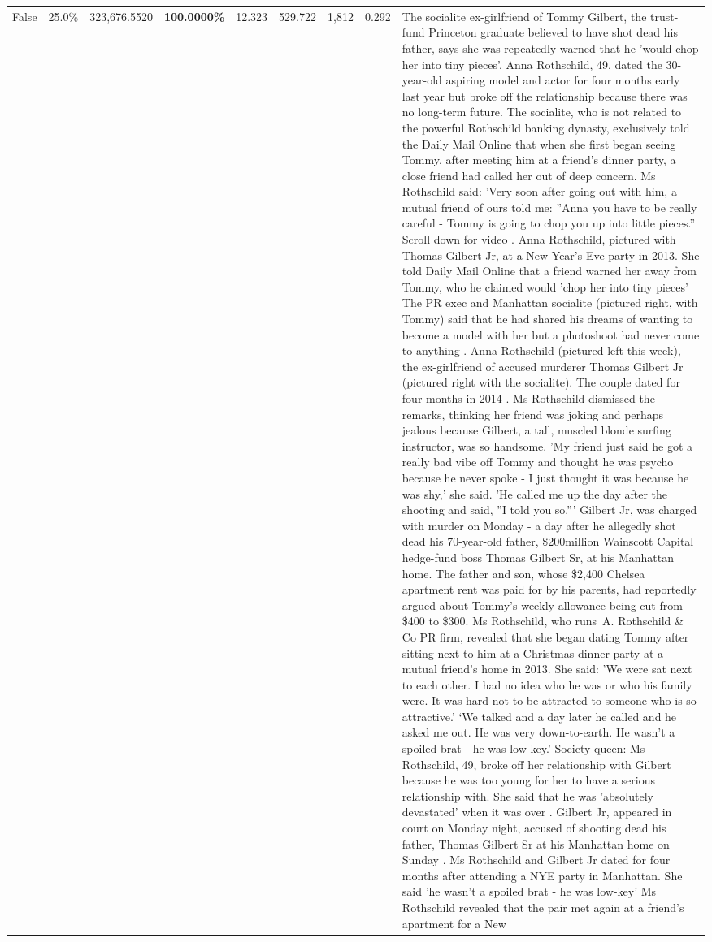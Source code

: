 \begin{table}[H]
\begin{tabular}{lllrlllll}
False & 25.0\% & 323,676.5520 & \bfseries \color{red} 100.0000\% & 12.323 & 529.722 & 1,812 & 0.292 & The socialite ex-girlfriend of Tommy Gilbert, the trust-fund Princeton graduate believed to have shot dead his father, says she was repeatedly warned that he 'would chop her into tiny pieces'. Anna Rothschild, 49, dated the 30-year-old aspiring model and actor for four months early last year but broke off the relationship because there was no long-term future. The socialite, who is not related to the powerful Rothschild banking dynasty, exclusively told the Daily Mail Online that when she first began seeing Tommy, after meeting him at a friend's dinner party, a close friend had called her out of deep concern. Ms Rothschild said: 'Very soon after going out with him, a mutual friend of ours told me: ''Anna you have to be really careful - Tommy is going to chop you up into little pieces.'' Scroll down for video . Anna Rothschild, pictured with Thomas Gilbert Jr, at a New Year's Eve party in 2013. She told Daily Mail Online that a friend warned her away from Tommy, who he claimed would 'chop her into tiny pieces' The PR exec and Manhattan socialite (pictured right, with Tommy) said that he had shared his dreams of wanting to become a model with her but a photoshoot had never come to anything . Anna Rothschild (pictured left this week), the ex-girlfriend of accused murderer Thomas Gilbert Jr (pictured right with the socialite). The couple dated for four months in 2014 . Ms Rothschild dismissed the remarks, thinking her friend was joking and perhaps jealous because Gilbert, a tall, muscled blonde surfing instructor, was so handsome. 'My friend just said he got a really bad vibe off Tommy and thought he was psycho because he never spoke - I just thought it was because he was shy,' she said. 'He called me up the day after the shooting and said, ''I told you so.''' Gilbert Jr, was charged with murder on Monday - a day after he allegedly shot dead his 70-year-old father, \$200million Wainscott Capital hedge-fund boss Thomas Gilbert Sr, at his Manhattan home. The father and son, whose \$2,400 Chelsea apartment rent was paid for by his parents, had reportedly argued about Tommy's weekly allowance being cut from \$400 to \$300. Ms Rothschild, who runs A. Rothschild \& Co PR firm, revealed that she began dating Tommy after sitting next to him at a Christmas dinner party at a mutual friend's home in 2013. She said: 'We were sat next to each other. I had no idea who he was or who his family were. It was hard not to be attracted to someone who is so attractive.' ‘We talked and a day later he called and he asked me out. He was very down-to-earth. He wasn’t a spoiled brat - he was low-key.’ Society queen: Ms Rothschild, 49, broke off her relationship with Gilbert because he was too young for her to have a serious relationship with. She said that he was 'absolutely devastated' when it was over . Gilbert Jr, appeared in court on Monday night, accused of shooting dead his father, Thomas Gilbert Sr at his Manhattan home on Sunday . Ms Rothschild and Gilbert Jr dated for four months after attending a NYE party in Manhattan. She said 'he wasn't a spoiled brat - he was low-key' Ms Rothschild revealed that the pair met again at a friend’s apartment for a New 
\end{tabular}
\end{table}
